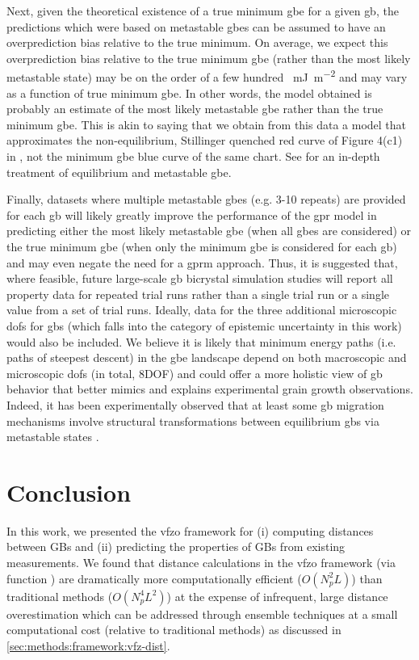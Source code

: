 \documentclass[final,twocolumn,12pt]{elsarticle}
\begin{document}
Next, given the theoretical existence of a true minimum \gls{gbe} for a given \gls{gb}, the predictions which were based on metastable \glspl{gbe} can be assumed to have an overprediction bias relative to the true minimum. On average, we expect this overprediction bias relative to the true minimum \gls{gbe} (rather than the most likely metastable state) may be on the order of a few hundred \SI{}{\milli\J\per\square\meter} and may vary as a function of true minimum \gls{gbe}. In other words, the model obtained is probably an estimate of the most likely metastable \gls{gbe} rather than the true minimum \gls{gbe}. This is akin to saying that we obtain from this data a model that approximates the non-equilibrium, Stillinger quenched red curve of Figure 4(c1) in \cite{hanGrainboundaryMetastabilityIts2016}, not the minimum \gls{gbe} blue curve of the same chart. See \cite{hanGrainboundaryMetastabilityIts2016} for an in-depth treatment of equilibrium and metastable \gls{gbe}.

Finally, datasets where multiple metastable \glspl{gbe} (e.g. 3-10 repeats) are provided for each \gls{gb} will likely greatly improve the performance of the \gls{gpr} model in predicting either the most likely metastable \gls{gbe} (when all \glspl{gbe} are considered) or the true minimum \gls{gbe} (when only the minimum \gls{gbe} is considered for each \gls{gb}) and may even negate the need for a \gls{gprm} approach. Thus, it is suggested that, where feasible, future large-scale \gls{gb} bicrystal simulation studies will report all property data for repeated trial runs rather than a single trial run or a single value from a set of trial runs. Ideally, data for the three additional microscopic \glspl{dof} for \glspl{gb} (which falls into the category of epistemic uncertainty in this work) would also be included. We believe it is likely that minimum energy paths (i.e. paths of steepest descent) in the \gls{gbe} landscape depend on both macroscopic and microscopic \glspl{dof} (in total, 8DOF) and could offer a more holistic view of \gls{gb} behavior that better mimics and explains experimental grain growth observations. Indeed, it has been experimentally observed that at least some \gls{gb} migration mechanisms involve structural transformations between equilibrium \glspl{gb} via metastable states \cite{weiDirectImagingAtomistic2021}.

\section{Conclusion} \label{sec:conclusion}
In this work, we presented the \gls{vfzo} framework for (i) computing distances between GBs and (ii) predicting the properties of GBs from existing measurements. We found that distance calculations in the \gls{vfzo} framework (via \vfzorepo{} function ) are dramatically more computationally efficient ($O(N_p^2L)$) than traditional methods ($O(N_p^4L^2)$) at the expense of infrequent, large distance overestimation which can be addressed through ensemble techniques at a small computational cost (relative to traditional methods) as discussed in \cref{sec:methods:framework:vfz-dist}.
\end{document}
